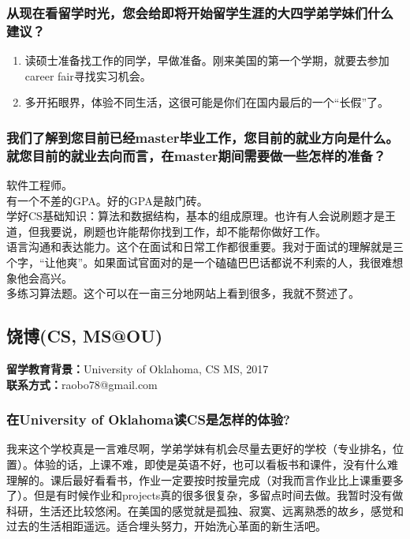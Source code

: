 \documentclass[a4paper,UTF8]{book}
\begin{document}
    \subsubsection*{从现在看留学时光，您会给即将开始留学生涯的大四学弟学妹们什么建议？}
        \begin{enumerate}[itemindent=0pt,itemsep=0pt,parsep=0pt]
            \item 读硕士准备找工作的同学，早做准备。刚来美国的第一个学期，就要去参加career fair寻找实习机会。
            \item 多开拓眼界，体验不同生活，这很可能是你们在国内最后的一个“长假”了。
        \end{enumerate}

    \subsubsection*{我们了解到您目前已经master毕业工作，您目前的就业方向是什么。就您目前的就业去向而言，在master期间需要做一些怎样的准备？}
    软件工程师。\\
    有一个不差的GPA。好的GPA是敲门砖。\\
    学好CS基础知识：算法和数据结构，基本的组成原理。也许有人会说刷题才是王道，但我要说，刷题也许能帮你找到工作，却不能帮你做好工作。\\
    语言沟通和表达能力。这个在面试和日常工作都很重要。我对于面试的理解就是三个字，“让他爽”。如果面试官面对的是一个磕磕巴巴话都说不利索的人，我很难想象他会高兴。\\
    多练习算法题。这个可以在一亩三分地网站上看到很多，我就不赘述了。



\clearpage
\subsection{饶博(CS, MS@OU)}
    \textbf{留学教育背景：}University of Oklahoma, CS MS, 2017	\\
    \textbf{联系方式：}raobo78@gmail.com

    \subsubsection*{在University of Oklahoma读CS是怎样的体验?}
    我来这个学校真是一言难尽啊，学弟学妹有机会尽量去更好的学校（专业排名，位置）。体验的话，上课不难，即使是英语不好，也可以看板书和课件，没有什么难理解的。课后最好看看书，作业一定要按时按量完成（对我而言作业比上课重要多了）。但是有时候作业和projects真的很多很复杂，多留点时间去做。我暂时没有做科研，生活还比较悠闲。在美国的感觉就是孤独、寂寞、远离熟悉的故乡，感觉和过去的生活相距遥远。适合埋头努力，开始洗心革面的新生活吧。
\end{document}
